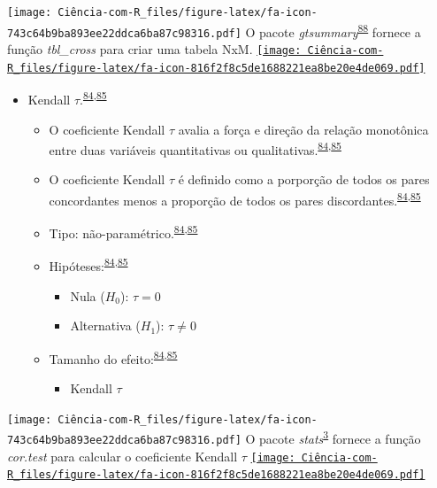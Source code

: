 \documentclass[
]{book}
\providecommand{\tightlist}{%
  \setlength{\itemsep}{0pt}\setlength{\parskip}{0pt}}
\begin{document}
\texttt{[image: Ciência-com-R\_files/figure-latex/fa-icon-743c64b9ba893ee22ddca6ba87c98316.pdf]} O pacote \emph{gtsummary}\textsuperscript{\protect\hyperlink{ref-gtsummary}{88}} fornece a função \emph{tbl\_cross} para criar uma tabela NxM. \href{https://cran.r-project.org/web/packages/gtsummary/index.html}{\texttt{[image: Ciência-com-R\_files/figure-latex/fa-icon-816f2f8c5de1688221ea8be20e4de069.pdf]}}

\begin{itemize}
\item
  Kendall \(\tau\).\textsuperscript{\protect\hyperlink{ref-khamis2008}{84},\protect\hyperlink{ref-allison2022}{85}}

  \begin{itemize}
  \item
    O coeficiente Kendall \(\tau\) avalia a força e direção da relação monotônica entre duas variáveis quantitativas ou qualitativas.\textsuperscript{\protect\hyperlink{ref-khamis2008}{84},\protect\hyperlink{ref-allison2022}{85}}
  \item
    O coeficiente Kendall \(\tau\) é definido como a porporção de todos os pares concordantes menos a proporção de todos os pares discordantes.\textsuperscript{\protect\hyperlink{ref-khamis2008}{84},\protect\hyperlink{ref-allison2022}{85}}
  \item
    Tipo: não-paramétrico.\textsuperscript{\protect\hyperlink{ref-khamis2008}{84},\protect\hyperlink{ref-allison2022}{85}}
  \item
    Hipóteses:\textsuperscript{\protect\hyperlink{ref-khamis2008}{84},\protect\hyperlink{ref-allison2022}{85}}

    \begin{itemize}
    \item
      Nula (\(H_{0}\)): \(\tau=0\)
    \item
      Alternativa (\(H_{1}\)): \(\tau≠0\)
    \end{itemize}
  \item
    Tamanho do efeito:\textsuperscript{\protect\hyperlink{ref-khamis2008}{84},\protect\hyperlink{ref-allison2022}{85}}

    \begin{itemize}
    \tightlist
    \item
      Kendall \(\tau\)
    \end{itemize}
  \end{itemize}
\end{itemize}

\texttt{[image: Ciência-com-R\_files/figure-latex/fa-icon-743c64b9ba893ee22ddca6ba87c98316.pdf]} O pacote \emph{stats}\textsuperscript{\protect\hyperlink{ref-stats-2}{3}} fornece a função \emph{cor.test} para calcular o coeficiente Kendall \(\tau\) \href{https://rdocumentation.org/packages/stats/versions/3.6.2}{\texttt{[image: Ciência-com-R\_files/figure-latex/fa-icon-816f2f8c5de1688221ea8be20e4de069.pdf]}}
\end{document}
